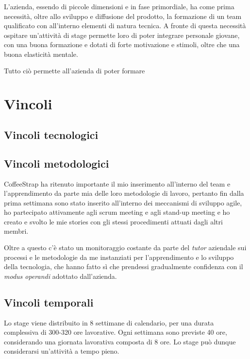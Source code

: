 L'azienda, essendo di piccole dimensioni e in fase primordiale, ha come prima necessità, oltre allo sviluppo e diffusione del prodotto, la formazione di un team qualificato con all'interno elementi di natura tecnica. A fronte di questa necessità ospitare un'attività di stage permette loro di poter integrare personale giovane, con una buona formazione e dotati di forte motivazione e stimoli, oltre che una buona elasticità mentale. 

Tutto ciò permette all'azienda di poter formare

\section{Vincoli}

\subsection{Vincoli tecnologici}



\subsection{Vincoli metodologici}

CoffeeStrap ha ritenuto importante il mio inserimento all'interno del team e l'apprendimento da parte mia delle loro metodologie di lavoro, pertanto fin dalla prima settimana sono stato inserito all'interno dei meccanismi di sviluppo agile, ho partecipato attivamente agli scrum meeting e agli stand-up meeting e ho creato e svolto le mie stories con gli stessi procedimenti attuati dagli altri membri. 

Oltre a questo c'è stato un monitoraggio costante da parte del \textit{tutor} aziendale sui processi e le metodologie da me instanziati per l'apprendimento e lo sviluppo della tecnologia, che hanno fatto sì che prendessi gradualmente confidenza con il \textit{modus operandi} adottato dall'azienda.

\subsection{Vincoli temporali}

Lo stage viene distribuito in 8 settimane di calendario, per una durata complessiva di 300-320 ore lavorative. Ogni settimana sono previste 40 ore, considerando una giornata lavorativa composta di 8 ore. Lo stage può dunque considerarsi un'attività a tempo pieno.

